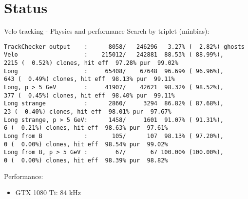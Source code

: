 \section{Status}

\begin{frame}[fragile]{Velo tracking - Physics and performance}
Search by triplet (minbias):
\begin{Verbatim}[fontsize=\tiny]
TrackChecker output    :      8058/   246296   3.27% (  2.82%) ghosts
Velo                   :    215012/   242881  88.53% ( 88.99%),      2215 (  0.52%) clones, hit eff  97.28% pur  99.02%
Long                   :     65408/    67648  96.69% ( 96.96%),       643 (  0.49%) clones, hit eff  98.13% pur  99.11%
Long, p > 5 GeV        :     41907/    42621  98.32% ( 98.52%),       377 (  0.45%) clones, hit eff  98.40% pur  99.11%
Long strange           :      2860/     3294  86.82% ( 87.68%),        23 (  0.40%) clones, hit eff  98.01% pur  97.67%
Long strange, p > 5 GeV:      1458/     1601  91.07% ( 91.31%),         6 (  0.21%) clones, hit eff  98.63% pur  97.61%
Long from B            :       105/      107  98.13% ( 97.20%),         0 (  0.00%) clones, hit eff  98.54% pur  99.02%
Long from B, p > 5 GeV :        67/       67 100.00% (100.00%),         0 (  0.00%) clones, hit eff  98.39% pur  98.82%
\end{Verbatim}

Performance:
\begin{itemize}
\item GTX 1080 Ti: 84 kHz
\end{itemize}
\end{frame}

